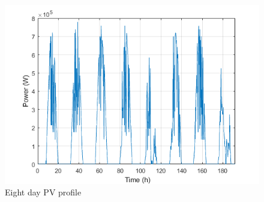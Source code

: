 

\begin{figure}[!ht]
    \centering
    \includegraphics[width = \linewidth]{figs/PV_PROFILE.png}
    \caption{Eight day PV profile}
    \label{fig:PV_PROFILE_8}
\end{figure}


